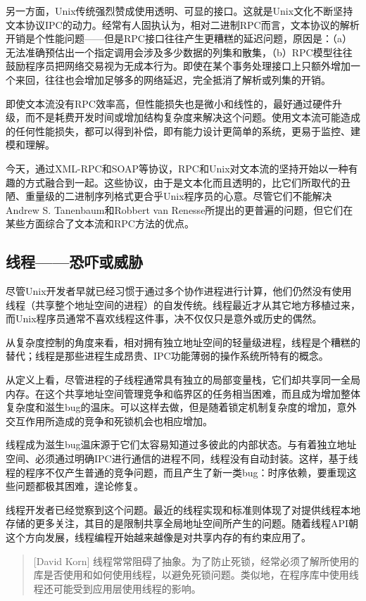 \documentclass[12pt,oneside]{book}
\begin{document}
\begin{common-format}
另一方面，Unix传统强烈赞成使用透明、可显的接口。这就是Unix文化不断坚持文本协议IPC的动力。经常有人固执认为，相对二进制RPC而言，文本协议的解析开销是个性能问题——但是RPC接口往往产生更糟糕的延迟问题，原因是：（a）无法准确预估出一个指定调用会涉及多少数据的列集和散集，（b）RPC模型往往鼓励程序员把网络交易视为无成本行为。即使在某个事务处理接口上只额外增加一个来回，往往也会增加足够多的网络延迟，完全抵消了解析或列集的开销。

即使文本流没有RPC效率高，但性能损失也是微小和线性的，最好通过硬件升级，而不是耗费开发时间或增加结构复杂度来解决这个问题。使用文本流可能造成的任何性能损失，都可以得到补偿，即有能力设计更简单的系统，更易于监控、建模和理解。

今天，通过XML-RPC和SOAP等协议，RPC和Unix对文本流的坚持开始以一种有趣的方式融合到一起。这些协议，由于是文本化而且透明的，比它们所取代的丑陋、重量级的二进制序列格式更合乎Unix程序员的心意。尽管它们不能解决Andrew S. Tanenbaum和Robbert van Renesse所提出的更普遍的问题，但它们在某些方面综合了文本流和RPC方法的优点。

\subsection{线程——恐吓或威胁}
尽管Unix开发者早就已经习惯于通过多个协作进程进行计算，他们仍然没有使用线程（共享整个地址空间的进程）的自发传统。线程最近才从其它地方移植过来，而Unix程序员通常不喜欢线程这件事，决不仅仅只是意外或历史的偶然。

从复杂度控制的角度来看，相对拥有独立地址空间的轻量级进程，线程是个糟糕的替代；线程是那些进程生成昂贵、IPC功能薄弱的操作系统所特有的概念。

从定义上看，尽管进程的子线程通常具有独立的局部变量栈，它们却共享同一全局内存。在这个共享地址空间管理竞争和临界区的任务相当困难，而且成为增加整体复杂度和滋生bug的温床。可以这样去做，但是随着锁定机制复杂度的增加，意外交互作用所造成的竞争和死锁机会也相应增加。

线程成为滋生bug温床源于它们太容易知道过多彼此的内部状态。与有着独立地址空间、必须通过明确IPC进行通信的进程不同，线程没有自动封装。这样，基于线程的程序不仅产生普通的竞争问题，而且产生了新一类bug：时序依赖，要重现这些问题都极其困难，遑论修复。

线程开发者已经觉察到这个问题。最近的线程实现和标准则体现了对提供线程本地存储的更多关注，其目的是限制共享全局地址空间所产生的问题。随着线程API朝这个方向发展，线程编程开始越来越像是对共享内存的有约束应用了。

\begin{quote}[David Korn]
线程常常阻碍了抽象。为了防止死锁，经常必须了解所使用的库是否使用和如何使用线程，以避免死锁问题。类似地，在程序库中使用线程还可能受到应用层使用线程的影响。
\end{quote}


\end{common-format}
\end{document}
